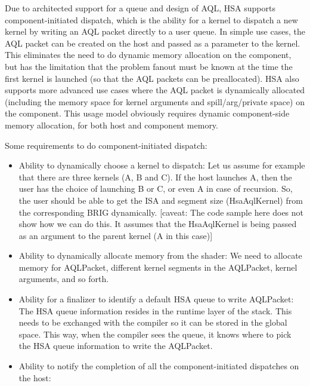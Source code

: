 \documentclass{book}
\begin{document}
\begin{appendices}
Due to architected support for a queue and design of AQL,
HSA supports component-\/initiated dispatch, which is the ability
for a kernel to dispatch a new kernel by writing an AQL packet
directly to a user queue. In simple use cases, the AQL packet
can be created on the host and passed as a parameter to the kernel.
This eliminates the need to do dynamic memory allocation on the
component, but has the limitation that the problem fanout must be known
at the time the first kernel is launched (so that the AQL
packets can be preallocated). HSA also supports more advanced
use cases where the AQL packet is dynamically allocated
(including the memory space for kernel arguments and
spill/arg/private space) on the component. This usage model obviously
requires dynamic component-\/side memory allocation, for both host and
component memory.

Some requirements to do component-\/initiated dispatch\-:

\begin{itemize}

\item Ability to dynamically choose a kernel to dispatch\-: Let us
assume for example that there are three kernels (A, B and C). If the
host launches A, then the user has the choice of launching B or C,
or even A in case of recursion. So, the user should be able to get
the ISA and segment size (Hsa\-Aql\-Kernel) from the
corresponding BRIG dynamically. \mbox{[}caveat\-: The code
sample here does not show how we can do this. It assumes that the
Hsa\-Aql\-Kernel is being passed as an argument to the parent kernel
(A in this case)\mbox{]}

\item Ability to dynamically allocate memory from the shader\-: We
need to allocate memory for AQL\-Packet, different kernel
segments in the AQL\-Packet, kernel arguments, and so forth.

\item Ability for a finalizer to identify a default HSA queue to
write AQL\-Packet\-: The HSA queue information resides in
the runtime layer of the stack. This needs to be exchanged with the
compiler so it can be stored in the global space. This way, when the
compiler sees the queue, it knows where to pick the HSA queue
information to write the AQL\-Packet.

\item Ability to notify the completion of all the
component-\/initiated dispatches on the host\-:


\end{itemize}
\end{appendices}
\end{document}
